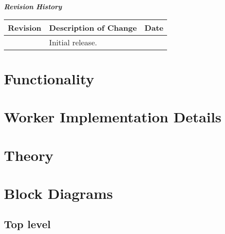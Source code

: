 \begin{center}
  \textit{\textbf{Revision History}}
\end{center}
\begin{longtable}{|p{}
                  |p{}
                  |p{}|}
  \hline
  \rowcolor{blue}
  \textbf{Revision} & \textbf{Description of Change} & \textbf{Date} \\
  \hline
   & Initial release. & \\
  \hline
\end{longtable}
\newpage

\def\componentlibrary{}
\def\name{\comp}
\def\releasedate{}
\def\testedplatforms{}
\def\version{\ocpiversion}
\def\workers{}
\def\workertype{}


\section*{Functionality}
\begin{flushleft}
\end{flushleft}

\section*{Worker Implementation Details}
\begin{flushleft}
\end{flushleft}

\section*{Theory}
\begin{flushleft}
\end{flushleft}

\section*{Block Diagrams}
\subsection*{Top level}
\begin{center}
\end{center}\pagebreak


